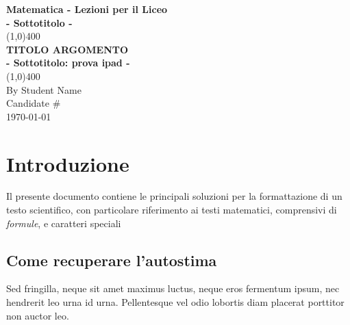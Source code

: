 \documentclass[11pt, landscape]{article}
\begin{document}
\begin{titlepage}
\begin{center}
\vspace*{1cm}
\Large{\textbf{Matematica - Lezioni per il Liceo}}\\
\large{\textbf{- Sottotitolo -}}\\
\vfill
\line(1,0){400}\\[.5mm]
\huge{\textbf{TITOLO ARGOMENTO}}\\[3mm]
\Large{\textbf{- Sottotitolo: prova ipad -}}\\[1mm]
\line(1,0){400}\\
\vfill
{\scriptsize By Student Name}\\
{\scriptsize Candidate \#} \\
{\scriptsize \today} \\

\end{center}
\end{titlepage}


\tableofcontents
\thispagestyle{empty}
\clearpage

\setcounter{page}{1}

\vspace*{1cm}
\section{Introduzione}
Il presente documento contiene le principali soluzioni per la formattazione di un testo scientifico, con particolare riferimento ai testi matematici, comprensivi di \emph{formule}, e caratteri speciali

\subsection{Come recuperare l'autostima}
Sed fringilla, neque sit amet maximus luctus, neque eros fermentum ipsum, nec hendrerit leo urna id urna. Pellentesque vel odio lobortis diam placerat porttitor non auctor leo.\\
\end{document}
